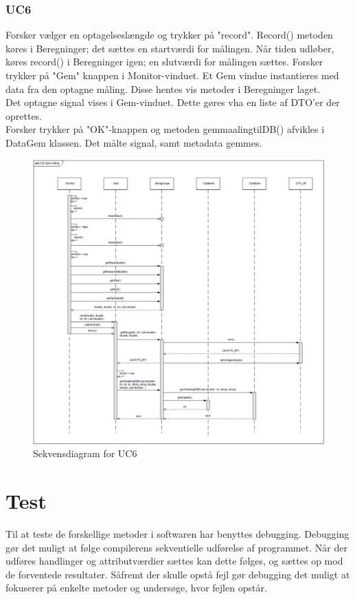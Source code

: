 \subsubsection{UC6}
Forsker vælger en optagelseslængde og trykker på "record". Record() metoden køres i Beregninger; det sættes en startværdi for målingen.
Når tiden udløber, køres record() i Beregninger igen; en slutværdi for målingen sættes.
Forsker trykker på "Gem" knappen i Monitor-vinduet. Et Gem vindue instantieres med data fra den optagne måling. Disse hentes vis metoder i Beregninger laget.\\
Det optagne signal vises i Gem-vinduet. Dette gøres vha en liste af DTO'er der oprettes.\\

Forsker trykker på "OK"\--knappen
og metoden gemmaalingtilDB() afvikles i DataGem klassen. Det målte signal, samt metadata gemmes. 

\begin{figure}[H]
	\centering
	\includegraphics[width=1\textwidth]{Figurer/UC6_SD_SW}
	\caption{Sekvensdiagram for UC6}
\end{figure}

\section{Test}
Til at teste de forskellige metoder i softwaren har benyttes debugging. Debugging gør det muligt at følge compilerens sekventielle udførelse af programmet. Når der udføres handlinger og attributværdier sættes kan dette følges, og sættes op mod de forventede resultater. Såfremt der skulle opstå fejl gør debugging det muligt at fokuserer på enkelte metoder og undersøge, hvor fejlen opstår.
